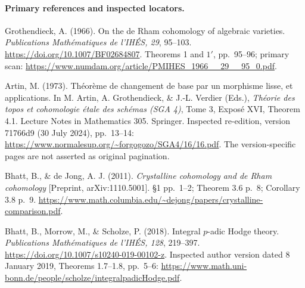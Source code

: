 \paragraph{Primary references and inspected locators.}
Grothendieck, A. (1966). On the de Rham cohomology of algebraic
varieties. \emph{Publications Math\'ematiques de l'IH\'ES, 29},
95--103. \url{https://doi.org/10.1007/BF02684807}.
Theorems 1 and $1'$, pp.~95--96; primary scan:
\url{https://www.numdam.org/article/PMIHES_1966__29__95_0.pdf}.

Artin, M. (1973). Th\'eor\`eme de changement de base par un
morphisme lisse, et applications. In M. Artin, A. Grothendieck,
\& J.-L. Verdier (Eds.), \emph{Th\'eorie des topos et cohomologie
\'etale des sch\'emas (SGA 4)}, Tome 3, Expos\'e XVI,
Theorem 4.1. Lecture Notes in Mathematics 305. Springer.
Inspected re-edition, version 71766d9 (30 July 2024), pp.~13--14:
\url{https://www.normalesup.org/~forgogozo/SGA4/16/16.pdf}.
The version-specific pages are not asserted as original pagination.

Bhatt, B., \& de Jong, A. J. (2011).
\emph{Crystalline cohomology and de Rham cohomology}
[Preprint, arXiv:1110.5001]. \S1 pp.~1--2; Theorem 3.6 p.~8;
Corollary 3.8 p.~9.
\url{https://www.math.columbia.edu/~dejong/papers/crystalline-comparison.pdf}.

Bhatt, B., Morrow, M., \& Scholze, P. (2018).
Integral $p$-adic Hodge theory.
\emph{Publications Math\'ematiques de l'IH\'ES, 128}, 219--397.
\url{https://doi.org/10.1007/s10240-019-00102-z}.
Inspected author version dated 8 January 2019, Theorems 1.7--1.8,
pp.~5--6:
\url{https://www.math.uni-bonn.de/people/scholze/integralpadicHodge.pdf}.
